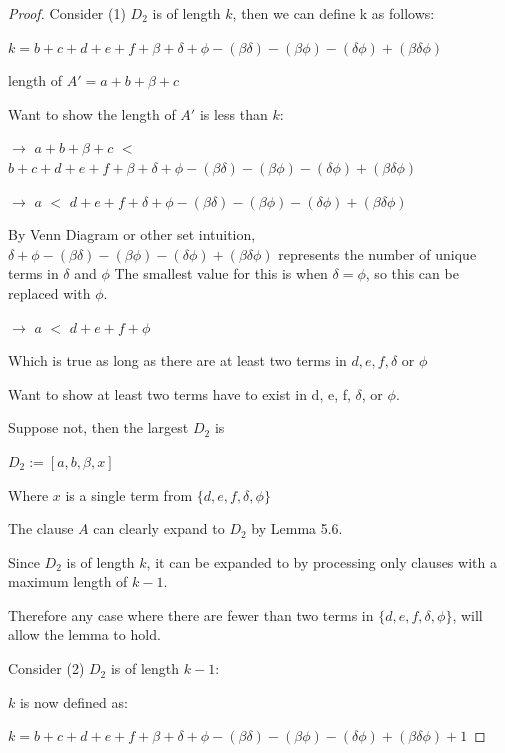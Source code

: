 \documentclass[manuscript]{acmart}
\begin{document}
\begin{proof}
        Consider (1) $D_2$ is of length $k$, then we can define k as follows:

        $k = b + c + d + e + f + \beta + \delta + \phi - (\beta \delta) 
        - (\beta \phi) - (\delta \phi) + (\beta \delta \phi)$

        length of $A' = a + b + \beta + c$

        Want to show the length of $A'$ is less than $k$:

        $\rightarrow$ $a + b + \beta + c$ $<$ $b + c + d + e + f + 
        \beta + \delta + \phi - (\beta \delta) 
        - (\beta \phi) - (\delta \phi) + (\beta \delta \phi)$

        $\rightarrow$ $a$ $<$ $d + e + f + \delta + \phi - (\beta \delta) 
        - (\beta \phi) - (\delta \phi) + (\beta \delta \phi)$

        By Venn Diagram or other set intuition, 
        $\delta + \phi - (\beta \delta) - (\beta \phi) - (\delta \phi) + 
        (\beta \delta \phi)$ represents the number of unique terms in 
        $\delta$ and $\phi$
        The smallest value for this is when $\delta = \phi$, so this can
        be replaced with $\phi$.

        $\rightarrow$ $a$ $<$ $d + e + f + \phi$

        Which is true as long as there are at least two terms in $d, e, f, \delta$ or $\phi$

        Want to show at least two terms have to exist in d, e, f, $\delta$, or $\phi$.

        Suppose not, then the largest $D_2$ is

        $D_2 := [a, b, \beta, x]$

        Where $x$ is a single term from $\{d, e, f, \delta, \phi\}$

        The clause $A$ can clearly expand to $D_2$ by Lemma 5.6. 
        
        Since $D_2$ is of length $k$, it can be expanded to by processing
        only clauses with a maximum length of $k-1$.

        Therefore any case where there are fewer than two terms in 
        $\{d, e, f, \delta, \phi\}$, will allow the lemma to hold.

        Consider (2) $D_2$ is of length $k - 1$:

        $k$ is now defined as:

        $k = b + c + d + e + f + \beta + \delta + \phi - (\beta \delta) 
        - (\beta \phi) - (\delta \phi) + (\beta \delta \phi) + 1$


\end{proof}
\end{document}
